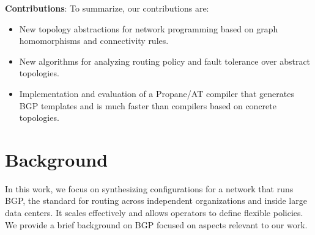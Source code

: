 \documentclass[numbers, 10pt]{sigplanconf}
\newcommand{\sysname}{{\text{}\small \sf Propane/AT}\xspace}
\begin{document}
\vspace{0.5em}
\noindent
\textbf{Contributions}: To summarize, our contributions are:
%
\begin{itemize}[noitemsep,nolistsep,label={\large\textbullet}]
\item New topology abstractions for network programming
based on graph homomorphisms and connectivity rules.
\item New algorithms for analyzing routing policy and fault tolerance over
abstract topologies.
\item Implementation and evaluation of a \sysname compiler that generates
BGP templates and is much faster
than compilers based on concrete topologies.
\end{itemize}




%
%
%
%

\section{Background}
\label{sec:background}

In this work, we focus on synthesizing configurations for a network that runs BGP, the standard for routing across independent organizations and inside large data centers. It scales effectively and allows operators to define flexible policies. We provide a brief background on BGP focused on aspects relevant to our work. 
\end{document}
